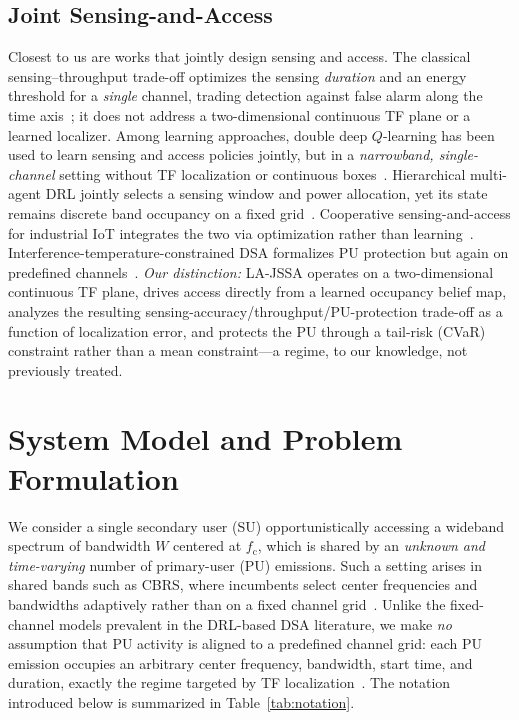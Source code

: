 \documentclass[journal]{IEEEtran}
\newcommand{\Wband}{W}                     %
\newcommand{\fc}{f_{\mathrm{c}}}           %
\begin{document}
\subsection{Joint Sensing-and-Access}
Closest to us are works that jointly design sensing and access. The classical
sensing--throughput trade-off optimizes the sensing \emph{duration} and an
energy threshold for a \emph{single} channel, trading detection against
false alarm along the time axis~\cite{liang2008sensing}; it does not address
a two-dimensional continuous TF plane or a learned localizer. Among learning
approaches, double deep $Q$-learning has been used to learn sensing and
access policies jointly, but in a \emph{narrowband, single-channel} setting
without TF localization or continuous boxes~\cite{bokobza2023ddqsa}.
Hierarchical multi-agent DRL jointly selects a sensing window and power
allocation, yet its state remains discrete band occupancy on a fixed
grid~\cite{li2024hmadrl}. Cooperative sensing-and-access for industrial IoT
integrates the two via optimization rather than learning~\cite{liu2023ciiot}.
Interference-temperature-constrained DSA formalizes PU protection but again
on predefined channels~\cite{xing2007dsa}. \emph{Our distinction:} LA-JSSA
operates on a two-dimensional continuous TF plane, drives access directly
from a learned occupancy belief map, analyzes the resulting
sensing-accuracy/throughput/PU-protection trade-off as a function of
localization error, and protects the PU through a tail-risk (CVaR) constraint
rather than a mean constraint---a regime, to our knowledge, not previously
treated.


\section{System Model and Problem Formulation}
\label{sec:system_model}

We consider a single secondary user (SU) opportunistically accessing a
wideband spectrum of bandwidth $\Wband$ centered at $\fc$, which is
shared by an \emph{unknown and time-varying} number of primary-user (PU)
emissions. Such a setting arises in shared bands such as CBRS, where
incumbents select center frequencies and bandwidths adaptively rather than on
a fixed channel grid~\cite{sohul2015cbrs,xing2007dsa}. Unlike the
fixed-channel models prevalent in the DRL-based DSA literature, we make
\emph{no} assumption that PU activity is aligned to a predefined channel
grid: each PU emission occupies an arbitrary center frequency, bandwidth,
start time, and duration, exactly the regime targeted by TF
localization~\cite{prasad2020,zhao2025trtfl_ssl}. The notation introduced
below is summarized in Table~\ref{tab:notation}.
\end{document}
